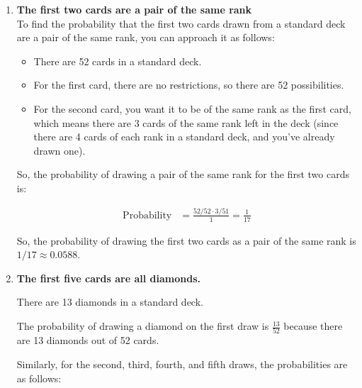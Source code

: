 {\begin{enumerate}
\begin{enumerate}
	Same as item (a) we can use the complement rule:
	\[ \text{Probability (at least one ace in the first five cards)} =\]
	\[ 1 - \text{ Probability (no aces in the first five cards)} \]
	
	Same as previous item, the probability of not getting an ace on the first 5 cards, is:
	\[ \frac{48}{52} \cdot \frac{47}{51} \cdot \frac{46}{50} \cdot \frac{45}{49} \cdot \frac{44}{48}\]
	
	So, the probability that the first five cards include at least one ace:
	\[ 1 - \left(\frac{48}{52} \cdot \frac{47}{51} \cdot \frac{46}{50} \cdot \frac{45}{49} \cdot \frac{44}{48} \right) \approx 0.3411 \]
	
	\item \textbf{The first two cards are a pair of the same rank}\\
	To find the probability that the first two cards drawn from a standard deck are a pair of the same rank, you can approach it as follows:
	
	\begin{itemize}
	\item There are 52 cards in a standard deck.
	\item For the first card, there are no restrictions, so there are 52 possibilities.
	\item For the second card, you want it to be of the same rank as the first card, which means there are 3 cards of the same rank left in the deck (since there are 4 cards of each rank in a standard deck, and you've already drawn one).
	\end{itemize}
	
	So, the probability of drawing a pair of the same rank for the first two cards is:
	
	\begin{align*}
	\text{Probability} &= \frac{52/52 \cdot 3/51}{1} = \frac{1}{17}
	\end{align*}
	
	So, the probability of drawing the first two cards as a pair of the same rank is $1/17 \approx 0.0588 $.
	
	\item \textbf{The first five cards are all diamonds.}
	
	There are 13 diamonds in a standard deck.
	
	The probability of drawing a diamond on the first draw is $ \frac{13}{52} $ because there are 13 diamonds out of 52 cards.
	
	Similarly, for the second, third, fourth, and fifth draws, the probabilities are as follows:
	

\end{enumerate}
\end{enumerate}}
